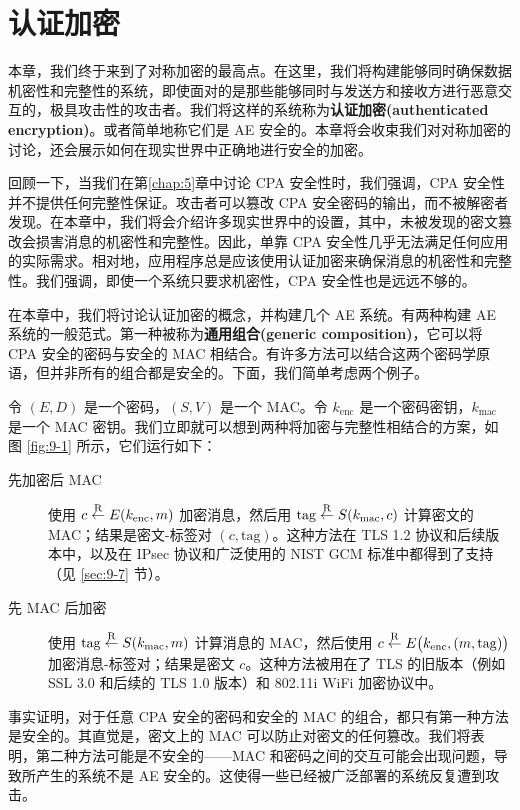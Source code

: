 \chapter{认证加密}\label{chap:9}

本章，我们终于来到了对称加密的最高点。在这里，我们将构建能够同时确保数据机密性和完整性的系统，即使面对的是那些能够同时与发送方和接收方进行恶意交互的，极具攻击性的攻击者。我们将这样的系统称为\textbf{认证加密(authenticated encryption)}。或者简单地称它们是 AE 安全的。本章将会收束我们对对称加密的讨论，还会展示如何在现实世界中正确地进行安全的加密。

回顾一下，当我们在第\ref{chap:5}章中讨论 CPA 安全性时，我们强调，CPA 安全性并不提供任何完整性保证。攻击者可以篡改 CPA 安全密码的输出，而不被解密者发现。在本章中，我们将会介绍许多现实世界中的设置，其中，未被发现的密文篡改会损害消息的机密性和完整性。因此，单靠 CPA 安全性几乎无法满足任何应用的实际需求。相对地，应用程序总是应该使用认证加密来确保消息的机密性和完整性。我们强调，即使一个系统只要求机密性，CPA 安全性也是远远不够的。

在本章中，我们将讨论认证加密的概念，并构建几个 AE 系统。有两种构建 AE 系统的一般范式。第一种被称为\textbf{通用组合(generic composition)}，它可以将 CPA 安全的密码与安全的 MAC 相结合。有许多方法可以结合这两个密码学原语，但并非所有的组合都是安全的。下面，我们简单考虑两个例子。

令 $(E,D)$ 是一个密码，$(S,V)$ 是一个 MAC。令 $k_\mathrm{enc}$ 是一个密码密钥，$k_\mathrm{mac}$ 是一个 MAC 密钥。我们立即就可以想到两种将加密与完整性相结合的方案，如图 \ref{fig:9-1} 所示，它们运行如下：
\begin{description}
	\item [先加密后 MAC] 使用 $c\overset{\rm R}\leftarrow E(k_\mathrm{enc},m)$ 加密消息，然后用 $\mathrm{tag}\overset{\rm R}\leftarrow S(k_\mathrm{mac},c)$ 计算密文的 MAC；结果是密文-标签对 $(c,\mathrm{tag})$。这种方法在 TLS 1.2 协议和后续版本中，以及在 IPsec 协议和广泛使用的 NIST GCM 标准中都得到了支持（见 \ref{sec:9-7} 节）。
	\item [先 MAC 后加密] 使用 $\mathrm{tag}\overset{\rm R}\leftarrow S(k_\mathrm{mac},m)$ 计算消息的 MAC，然后使用 $c\overset{\rm R}\leftarrow E\big(k_\mathrm{enc},(m,\mathrm{tag})\big)$ 加密消息-标签对；结果是密文 $c$。这种方法被用在了 TLS 的旧版本（例如 SSL 3.0 和后续的 TLS 1.0 版本）和 802.11i WiFi 加密协议中。
\end{description}
事实证明，对于任意 CPA 安全的密码和安全的 MAC 的组合，都只有第一种方法是安全的。其直觉是，密文上的 MAC 可以防止对密文的任何篡改。我们将表明，第二种方法可能是不安全的——MAC 和密码之间的交互可能会出现问题，导致所产生的系统不是 AE 安全的。这使得一些已经被广泛部署的系统反复遭到攻击。

